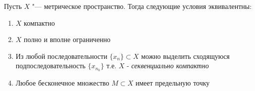 \begin{theorem}\label{thm3.2}
    Пусть $X$ "--- метрическое пространство. Тогда следующие условия эквивалентны:
    \begin{enumerate}
        \item $X$ компактно
        \item $X$ полно и вполне ограниченно
        \item Из любой последовательности $\{x_n\} \subset X$ можно выделить сходящуюся подпоследовательность $\{x_{n_k}\}$ т.е. $X$ - \textit{секвенциально компактно}
        \item Любое бесконечное множество $M \subset X$ имеет предельную точку
    \end{enumerate}
\end{theorem}

